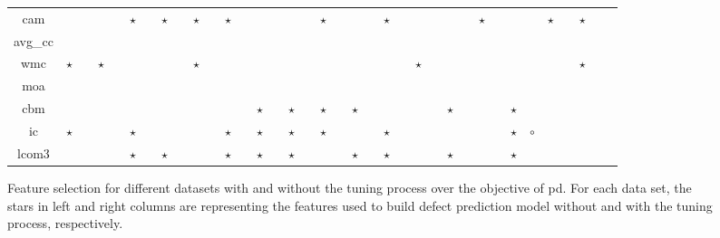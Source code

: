 \begin{figure*}[!ht]
\begin{tabular}{c|c c|c c|c c|c c|c c|c c|c c|c c|c c|c c|c c|c c|c c|c c|c c|c c|c c|c }
cam& & & & & $\star$& & $\star$& & $\star$& & $\star$& & & & & & $\star$& & & & $\star$& & & & & & $\star$& & & & $\star$& & $\star$& \\
avg\_cc& & & & & & & & & & & & & & & & & & & & & & & & & & & & & & & & & & \\
wmc& $\star$& & $\star$& & & & & & $\star$& & & & & & & & & & & & & & $\star$& & & & & & & & & & $\star$& \\
moa& & & & & & & & & & & & & & & & & & & & & & & & & & & & & & & & & & \\
cbm& & & & & & & & & & & & & $\star$& & $\star$& & $\star$& & $\star$& & & & & & $\star$& & & & $\star$& & & & & \\
ic& $\star$& & & & $\star$& & & & & & $\star$& & $\star$& & $\star$& & $\star$& & & & $\star$& & & & & & & & $\star$& $\circ$& & & & \\
lcom3& & & & & $\star$& & $\star$& & & & $\star$& & $\star$& & $\star$& & & & $\star$& & $\star$& & & & $\star$& & & & $\star$& & & & & \\

  \end{tabular}
    \caption{Feature selection for different datasets with  and without the tuning process over the objective of pd. For each data set, the stars in left and right columns are representing the features used to build defect prediction model without and with the tuning process, respectively.
 }
\end{figure*}
